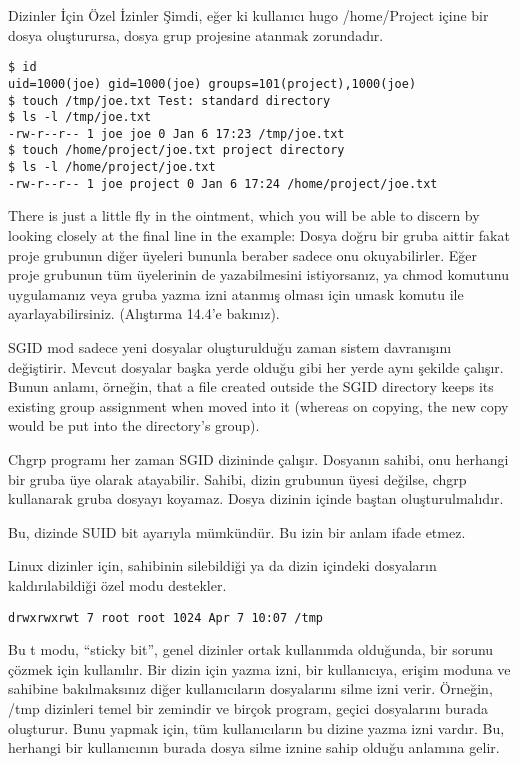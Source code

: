 \begin{section}{Dizinler İçin Özel İzinler}
Şimdi, eğer ki kullanıcı hugo /home/Project içine bir dosya oluşturursa, dosya grup projesine atanmak zorundadır.
\begin{verbatim}
$ id
uid=1000(joe) gid=1000(joe) groups=101(project),1000(joe)
$ touch /tmp/joe.txt Test: standard directory
$ ls -l /tmp/joe.txt
-rw-r--r-- 1 joe joe 0 Jan 6 17:23 /tmp/joe.txt
$ touch /home/project/joe.txt project directory
$ ls -l /home/project/joe.txt
-rw-r--r-- 1 joe project 0 Jan 6 17:24 /home/project/joe.txt
\end{verbatim}

There is just a little fly in the ointment, which you will be able to discern by looking closely at the final line in the example: Dosya doğru bir gruba aittir fakat proje grubunun diğer üyeleri bununla beraber sadece onu okuyabilirler. Eğer proje grubunun tüm üyelerinin de yazabilmesini istiyorsanız, ya chmod komutunu uygulamanız veya gruba yazma izni atanmış olması için umask komutu ile ayarlayabilirsiniz. (Alıştırma 14.4'e bakınız).

SGID mod sadece yeni dosyalar oluşturulduğu zaman sistem davranışını değiştirir. Mevcut dosyalar başka yerde olduğu gibi her yerde aynı şekilde çalışır. Bunun anlamı, örneğin, that a file created outside the SGID directory keeps its existing group assignment when moved into it (whereas on copying, the new copy would be put into the directory’s group).

Chgrp programı her zaman SGID dizininde çalışır. Dosyanın sahibi, onu herhangi bir gruba üye olarak atayabilir. Sahibi, dizin grubunun üyesi değilse, chgrp kullanarak gruba dosyayı koyamaz. Dosya dizinin içinde baştan oluşturulmalıdır.

Bu, dizinde SUID bit ayarıyla mümkündür. Bu izin bir anlam ifade etmez.

Linux dizinler için, sahibinin silebildiği ya da dizin içindeki dosyaların kaldırılabildiği özel modu destekler.
\begin{verbatim}
drwxrwxrwt 7 root root 1024 Apr 7 10:07 /tmp
\end{verbatim}

Bu t modu, “sticky bit”, genel dizinler ortak kullanımda olduğunda, bir sorunu çözmek için kullanılır. Bir dizin için yazma izni, bir kullanıcıya, erişim moduna ve sahibine bakılmaksınız diğer kullanıcıların dosyalarını silme izni verir. Örneğin, /tmp dizinleri temel bir zemindir ve birçok program, geçici dosyalarını burada oluşturur. Bunu yapmak için, tüm kullanıcıların bu dizine yazma izni vardır. Bu, herhangi bir kullanıcının burada dosya silme iznine sahip olduğu anlamına gelir.


\end{section}
